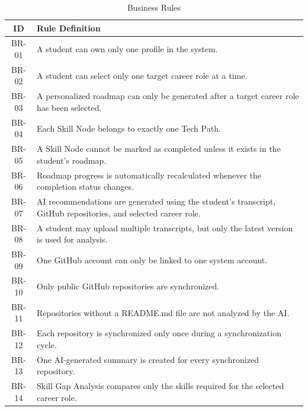 \begin{table}[H]
\centering
\caption{Business Rules}
\begin{tabular}{|c|p{11cm}|}
\hline
\textbf{ID} & \textbf{Rule Definition} \\ \hline

BR-01 &
A student can own only one profile in the system.
\\ \hline

BR-02 &
A student can select only one target career role at a time.
\\ \hline

BR-03 &
A personalized roadmap can only be generated after a target career role has been selected.
\\ \hline

BR-04 &
Each Skill Node belongs to exactly one Tech Path.
\\ \hline

BR-05 &
A Skill Node cannot be marked as completed unless it exists in the student's roadmap.
\\ \hline

BR-06 &
Roadmap progress is automatically recalculated whenever the completion status changes.
\\ \hline

BR-07 &
AI recommendations are generated using the student's transcript, GitHub repositories, and selected career role.
\\ \hline

BR-08 &
A student may upload multiple transcripts, but only the latest version is used for analysis.
\\ \hline

BR-09 &
One GitHub account can only be linked to one system account.
\\ \hline

BR-10 &
Only public GitHub repositories are synchronized.
\\ \hline

BR-11 &
Repositories without a README.md file are not analyzed by the AI.
\\ \hline

BR-12 &
Each repository is synchronized only once during a synchronization cycle.
\\ \hline

BR-13 &
One AI-generated summary is created for every synchronized repository.
\\ \hline

BR-14 &
Skill Gap Analysis compares only the skills required for the selected career role.
\\ \hline


\end{tabular}
\end{table}

